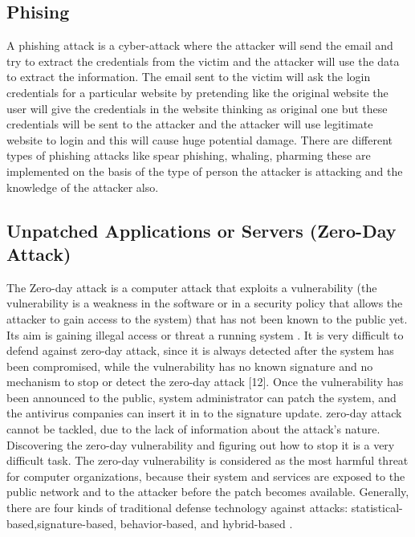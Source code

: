 \documentclass[twocolumn]{article}
\begin{document}
\subsection{Phising}
A phishing attack is a cyber-attack where the attacker will send the email and try to extract the credentials from the victim and the attacker
will use the data to extract the information. The email sent to the victim will ask the login credentials for a particular website by pretending like the
original website the user will give the credentials in the website thinking as original one but these credentials will be sent to the attacker and the attacker
will use legitimate website to login and this will cause huge potential damage. There are different types of phishing attacks like spear phishing, whaling,
pharming these are implemented on the basis of the type of person the attacker is attacking and the knowledge of the attacker also.\cite{kanakam2022bruteforce}
\subsection{Unpatched Applications or Servers (Zero-Day Attack)}


The Zero-day attack is a computer attack that exploits a vulnerability (the vulnerability is a weakness in the software or in a security policy that allows the attacker to gain access to the system) that has not been known to the public yet. Its aim is gaining illegal access or threat a running system . It is very difficult to defend against zero-day attack, since it is always detected after the system has been compromised, while the vulnerability has no known signature and no mechanism to stop or detect the zero-day attack [12]. Once the vulnerability has been announced to the public, system administrator can patch the system, and the antivirus companies can insert it in to the signature update.
 zero-day attack cannot be tackled, due to the lack of information about the attack’s nature. Discovering the zero-day vulnerability and figuring out how to stop it is a very difficult task. The zero-day vulnerability is considered as the most harmful threat for computer organizations, because their system and services are exposed to the public network and to the attacker before the patch becomes available. Generally, there are four kinds of traditional defense technology against attacks: statistical-based,signature-based, behavior-based, and hybrid-based . 
\end{document}
